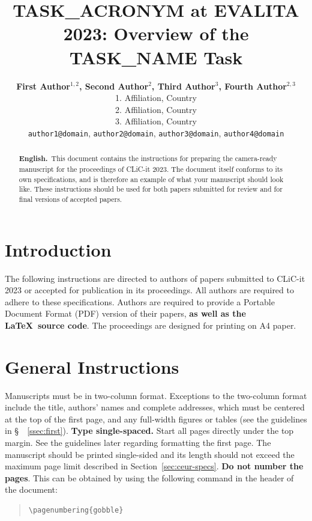 \documentclass[11pt]{article}
\title{TASK\_ACRONYM at EVALITA 2023: Overview of the TASK\_NAME Task}
\author{\textbf{First Author$^{1,2}$, Second Author$^{2}$, Third Author$^{3}$, Fourth Author$^{2,3}$} \\
  1. Affiliation, Country \\
  2. Affiliation, Country \\
  3. Affiliation, Country \\
  {\tt author1@domain}, {\tt author2@domain}, {\tt author3@domain}, {\tt author4@domain}}
\date{}
\begin{document}
\maketitle
\begin{abstract}
\textbf{English.}~This document contains the instructions for preparing the camera-ready manuscript for the proceedings of CLiC-it 2023. The document itself conforms to its own specifications, and is therefore an example of what your manuscript should look like. These instructions should be used for both papers submitted for review and for final versions of accepted papers.
\end{abstract}

\section{Introduction}

The following instructions are directed to authors of papers submitted
to CLiC-it 2023 or accepted for publication in its proceedings. All
authors are required to adhere to these specifications. Authors are
required to provide a Portable Document Format (PDF) version of their
papers, \textbf{as well as the \LaTeX\ source code}. The proceedings are designed for printing on A4 paper.

\section{General Instructions}

Manuscripts must be in two-column format.  Exceptions to the
two-column format include the title, authors' names and complete
addresses, which must be centered at the top of the first page, and
any full-width figures or tables (see the guidelines in \S\ ~\ref{ssec:first}). {\bf Type single-spaced.}  Start all
pages directly under the top margin. See the guidelines later
regarding formatting the first page.  The manuscript should be
printed single-sided and its length
should not exceed the maximum page limit described in Section~\ref{sec:ceur-specs}.
{\bf Do not number the pages}. This can be obtained by using the following command in the header of the document: 

\begin{quote}
\begin{verbatim}
\pagenumbering{gobble}
\end{verbatim}     
\end{quote}
\end{document}
